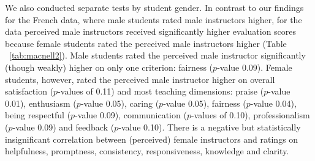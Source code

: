 \documentclass[12pt]{article}
\begin{document}
We also conducted separate tests by student gender.
In contrast to our findings for the French data, where male students rated male instructors higher, 
for the \citet{MacNell2014} data perceived male instructors received significantly higher evaluation scores because female students rated the perceived male instructors higher 
(Table ~\ref{tab:macnell2}). 
Male students rated the perceived male instructor significantly (though weakly) higher on only one criterion: fairness ($p$-value 0.09). 
Female students, however, rated the perceived male instructor higher on overall satisfaction ($p$-values of 0.11) and most teaching dimensions: praise ($p$-value 0.01), enthusiasm ($p$-value 0.05), caring ($p$-value 0.05), fairness ($p$-value 0.04), being respectful ($p$-value 0.09),  communication ($p$-values of 0.10), 
professionalism ($p$-value 0.09) and feedback ($p$-value 0.10). 
There is a negative but statistically insignificant correlation between (perceived) 
female instructors
and ratings on helpfulness, promptness, consistency, responsiveness, knowledge and clarity.
\end{document}

